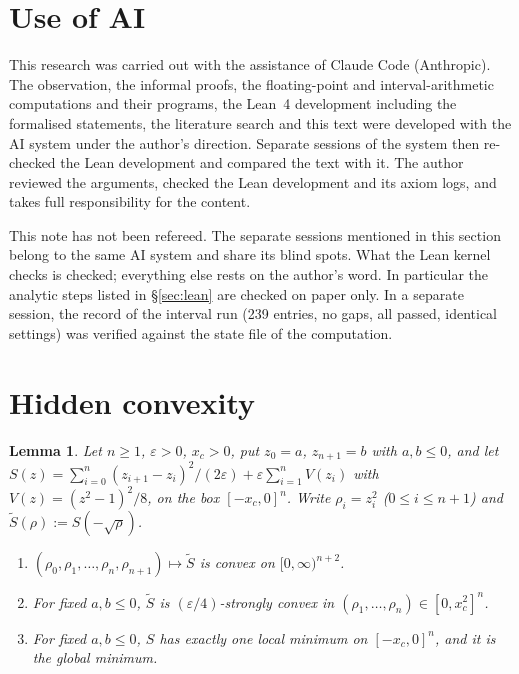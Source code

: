 \documentclass[11pt,a4paper]{article}
\newtheorem{lemma}[theorem]{Lemma}
\theoremstyle{definition}
\theoremstyle{remark}
\newcommand{\xc}{x_c}
\begin{document}
\section{Use of AI}\label{sec:ai}

This research was carried out with the assistance of Claude Code (Anthropic). The observation, the informal proofs, the floating-point and interval-arithmetic computations and their programs, the Lean~4 development including the formalised statements, the literature search and this text were developed with the AI system under the author's direction. Separate sessions of the system then re-checked the Lean development and compared the text with it. The author reviewed the arguments, checked the Lean development and its axiom logs, and takes full responsibility for the content.

This note has not been refereed. The separate sessions mentioned in this section belong to the same AI system and share its blind spots. What the Lean kernel checks is checked; everything else rests on the author's word. In particular the analytic steps listed in \S\ref{sec:lean} are checked on paper only. In a separate session, the record of the interval run (239 entries, no gaps, all passed, identical settings) was verified against the state file of the computation.

\appendix
\section{Hidden convexity}\label{app:K}

\begin{lemma}\label{lem:K}
Let $n\ge1$, $\varepsilon>0$, $\xc>0$, put $z_0=a$, $z_{n+1}=b$ with $a,b\le0$, and let $S(z)=\sum_{i=0}^{n}(z_{i+1}-z_i)^2/(2\varepsilon)+\varepsilon\sum_{i=1}^{n}V(z_i)$ with $V(z)=(z^2-1)^2/8$, on the box $[-\xc,0]^n$. Write $\rho_i=z_i^2$ ($0\le i\le n+1$) and $\tilde S(\rho):=S(-\sqrt\rho)$.
\begin{enumerate}[label=(\alph*)]
\item $(\rho_0,\rho_1,\dots,\rho_n,\rho_{n+1})\mapsto\tilde S$ is convex on $[0,\infty)^{n+2}$.
\item For fixed $a,b\le0$, $\tilde S$ is $(\varepsilon/4)$-strongly convex in $(\rho_1,\dots,\rho_n)\in[0,\xc^2]^n$.
\item For fixed $a,b\le0$, $S$ has exactly one local minimum on $[-\xc,0]^n$, and it is the global minimum.
\end{enumerate}
\end{lemma}
\end{document}
